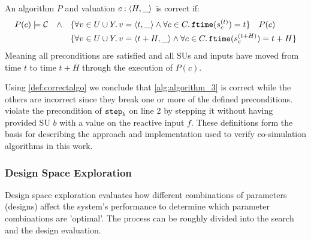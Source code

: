 \begin{definition}\label{def:correctalgo}
  An algorithm $P$ and valuation $c:  \left\langle H, \_ \right\rangle $ is correct if:
  \begin{align*}
     P(c) \models \mathcal{C} \quad \land \quad
     &\{\forall v \in U \cup Y \ldotp v =  \left\langle t, \_ \right\rangle  \land \forall c \in C \ldotp \mathtt{ftime}(s_{c}^{(t)}) = t\} \quad P(c) \\
     & \{\forall v \in U \cup Y \ldotp v =  \left\langle t+H, \_ \right\rangle  \land \forall c \in C \ldotp \mathtt{ftime}(s_{c}^{(t+H)}) = t+H \}
  \end{align*}
  Meaning all preconditions are satisfied and all SUs and inputs have moved from time $t$ to time $t+H$ through the execution of $P(c)$.
\end{definition}

Using \cref{def:correctalgo} we conclude that \cref{alg:algorithm_3} is correct while the others are incorrect since they break one or more of the defined preconditions.  violate the precondition of $\mathtt{step}_{b}$ on line 2 by stepping it without having provided SU $b$ with a value on the reactive input $f$. 
These definitions form the basis for describing the approach and implementation used to verify co-simulation algorithms in this work.


\subsubsection{Design Space Exploration}
Design space exploration evaluates how different combinations of parameters (designs) affect the system's performance to determine which parameter combinations are 'optimal'.
The process can be roughly divided into the search and the design evaluation.

